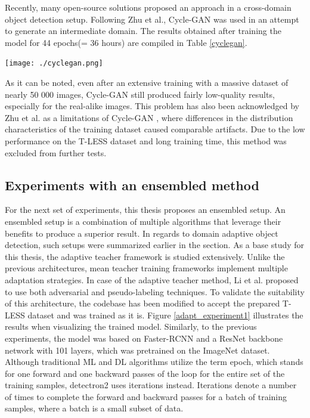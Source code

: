 \documentclass[english, 12pt, a4paper, elec, utf8, a-1b, online]{aaltothesis}
\begin{document}
Recently, many open-source solutions proposed \cite{Inoue_2018_CVPR} \cite{Chen2020} \cite{Arruda2019} an  approach in a cross-domain object detection setup. Following Zhu et al., Cycle-GAN \cite{Zhu2017} was used in an attempt to generate an intermediate domain. The results obtained after training the model for 44 epochs(= 36 hours) are compiled in Table \ref{cyclegan}.  

\begin{table}[htb]
	\begin{center}
		\texttt{[image: ./cyclegan.png]}
	\end{center}
	\begin{center}
		\label{cyclegan}
	\end{center}
\end{table}
\FloatBarrier

As it can be noted, even after an extensive training with a massive dataset of nearly 50 000 images, Cycle-GAN still produced fairly low-quality results, especially for the real-alike images. This problem has also been acknowledged by Zhu et al. as a limitations of Cycle-GAN \cite{Zhu2017}, where differences in the distribution characteristics of the training dataset caused comparable artifacts. Due to the low performance on the T-LESS dataset and long training time, this method was excluded from further tests. 


\subsection{Experiments with an ensembled method}
\label{ensemExp} 
For the next set of experiments, this thesis proposes an ensembled setup. An ensembled setup is a combination of multiple algorithms that leverage their benefits to produce a superior result. In regards to domain adaptive object detection, such setups were summarized earlier in the  section. As a base study for this thesis, the adaptive teacher \cite{Li2021}  framework is studied extensively. Unlike the  previous architectures, mean teacher training frameworks implement multiple adaptation strategies. In case of the adaptive teacher method, Li et al. proposed to use both adversarial and pseudo-labeling techniques. To validate the suitability of this architecture, the codebase has been modified to accept the prepared T-LESS dataset and was trained as it is. Figure \ref{adapt_experiment1} illustrates the results when visualizing the trained model. Similarly, to the previous experiments, the model was based on Faster-RCNN \cite{ima} and a ResNet \cite{He2015} backbone network with 101 layers, which was pretrained on the ImageNet \cite{Russakovsky2014}dataset. Although traditional ML and DL algorithms utilize the term epoch, which stands for one forward and one backward passes of the loop for the entire set of the training samples, detectron2 \cite{wu2019detectron2} uses iterations instead. Iterations denote a number of times to complete the forward and backward passes for a batch of training samples, where a batch is a small subset of data. 
\end{document}
